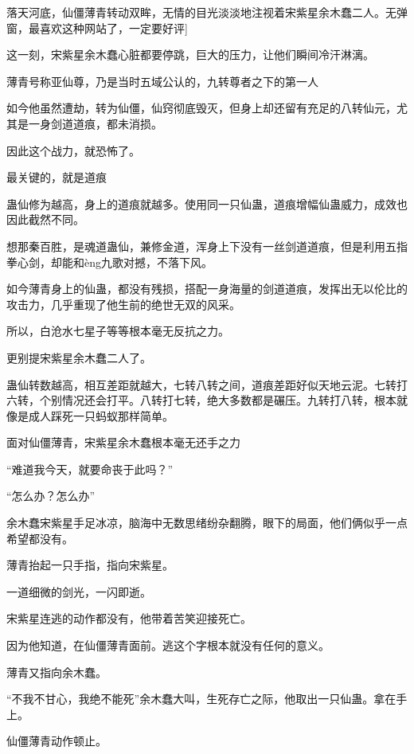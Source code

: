 
\begin{this_body}

落天河底，仙僵薄青转动双眸，无情的目光淡淡地注视着宋紫星余木蠢二人。无弹窗，最喜欢这种网站了，一定要好评]

这一刻，宋紫星余木蠢心脏都要停跳，巨大的压力，让他们瞬间冷汗淋漓。

薄青号称亚仙尊，乃是当时五域公认的，九转尊者之下的第一人

如今他虽然遭劫，转为仙僵，仙窍彻底毁灭，但身上却还留有充足的八转仙元，尤其是一身剑道道痕，都未消损。

因此这个战力，就恐怖了。

最关键的，就是道痕

蛊仙修为越高，身上的道痕就越多。使用同一只仙蛊，道痕增幅仙蛊威力，成效也因此截然不同。

想那秦百胜，是魂道蛊仙，兼修金道，浑身上下没有一丝剑道道痕，但是利用五指拳心剑，却能和èng九歌对撼，不落下风。

如今薄青身上的仙蛊，都没有残损，搭配一身海量的剑道道痕，发挥出无以伦比的攻击力，几乎重现了他生前的绝世无双的风采。

所以，白沧水七星子等等根本毫无反抗之力。

更别提宋紫星余木蠢二人了。

蛊仙转数越高，相互差距就越大，七转八转之间，道痕差距好似天地云泥。七转打六转，个别情况还会打平。八转打七转，绝大多数都是碾压。九转打八转，根本就像是成人踩死一只蚂蚁那样简单。

面对仙僵薄青，宋紫星余木蠢根本毫无还手之力

“难道我今天，就要命丧于此吗？”

“怎么办？怎么办”

余木蠢宋紫星手足冰凉，脑海中无数思绪纷杂翻腾，眼下的局面，他们俩似乎一点希望都没有。

薄青抬起一只手指，指向宋紫星。

一道细微的剑光，一闪即逝。

宋紫星连逃的动作都没有，他带着苦笑迎接死亡。

因为他知道，在仙僵薄青面前。逃这个字根本就没有任何的意义。

薄青又指向余木蠢。

“不我不甘心，我绝不能死”余木蠢大叫，生死存亡之际，他取出一只仙蛊。拿在手上。

仙僵薄青动作顿止。


\end{this_body}
